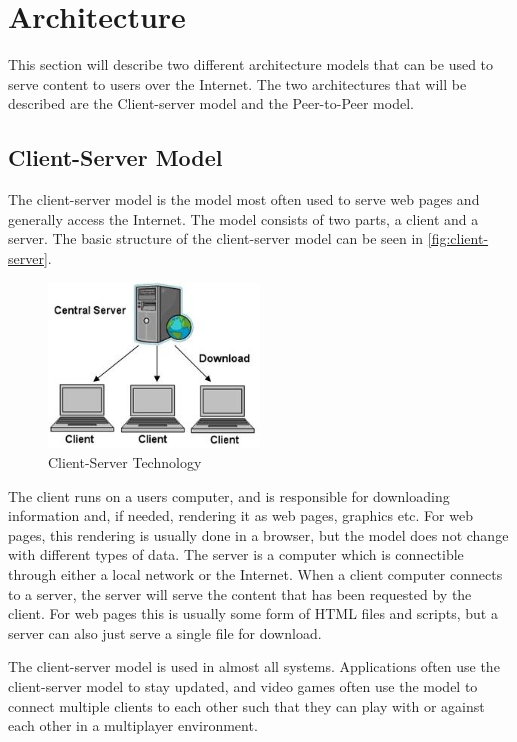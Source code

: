 \section{Architecture}
\label{sec:architecture}

This section will describe two different architecture models that can be used to serve content to users over the Internet. The two architectures that will be described are the Client-server model and the Peer-to-Peer model.

\subsection{Client-Server Model}
The client-server model is the model most often used to serve web pages and generally access the Internet. The model consists of two parts, a client and a server.
The basic structure of the client-server model can be seen in \autoref{fig:client-server}.

\begin{figure}[ht]
  \centering
    \includegraphics[width=0.5\textwidth]{img/client_server.jpg}
  \caption{Client-Server Technology \citep{ClientServer}}
  \label{fig:client-server}
\end{figure}

The client runs on a users computer, and is responsible for downloading information and, if needed, rendering it as web pages, graphics etc. For web pages, this rendering is usually done in a browser, but the model does not change with different types of data.
The server is a computer which is connectible through either a local network or the Internet. When a client computer connects to a server, the server will serve the content that has been requested by the client. For web pages this is usually some form of HTML files and scripts, but a server can also just serve a single file for download.

The client-server model is used in almost all systems. Applications often use the client-server model to stay updated, and video games often use the model to connect multiple clients to each other such that they can play with or against each other in a multiplayer environment.

